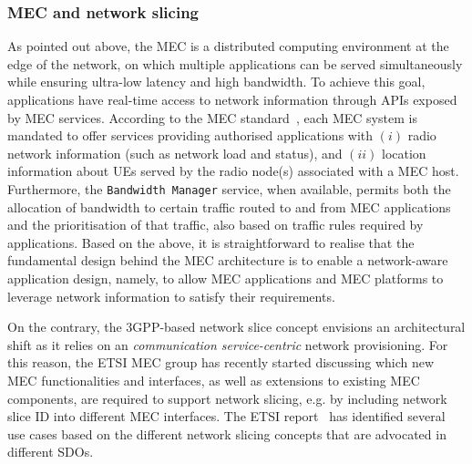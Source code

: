 \subsubsection{MEC and network slicing}
\noindent
As pointed out above, the MEC is a distributed computing environment at the edge of the network, on which multiple applications can be served simultaneously while ensuring ultra-low latency and high bandwidth. To achieve this goal, applications have real-time access to network information through APIs exposed by MEC services. According to the MEC standard~\cite{MEC003}, each MEC system is mandated to offer services providing authorised applications with $(i)$ radio network information (such as network load and status), and $(ii)$ location information about UEs served by the radio node(s) associated with a MEC host. Furthermore, the \texttt{Bandwidth Manager} service, when available, permits both the allocation of bandwidth to certain traffic routed to and from MEC applications and the prioritisation of that traffic, also based on traffic rules required by applications. Based on the above, it is straightforward to realise that the fundamental design behind the MEC architecture is to enable a network-aware application design, namely, to allow MEC applications and MEC platforms to leverage network information to satisfy their requirements.

On the contrary, the 3GPP-based network slice concept envisions an architectural shift as it relies on an \textit{communication service-centric} network provisioning. For this reason, the ETSI MEC group has recently started discussing which new MEC functionalities and interfaces, as well as extensions to existing MEC components, are required to support network slicing, e.g. by including network slice ID into different MEC interfaces. The ETSI report~\cite{MEC024} has identified several use cases based on the different network slicing concepts that are advocated in different SDOs. 

